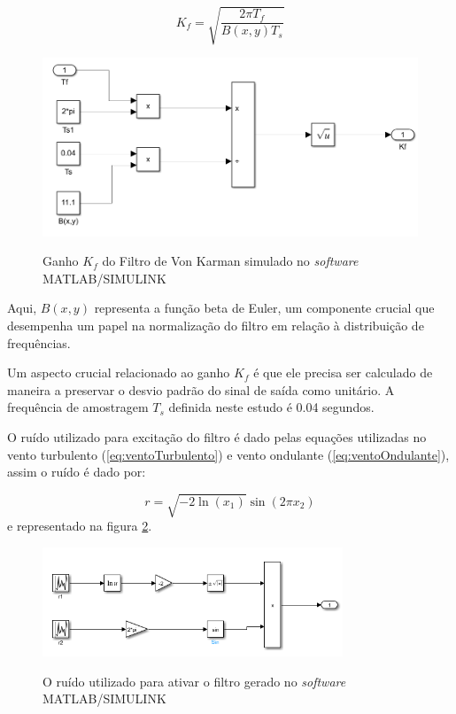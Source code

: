 \begin{equation}
K_f = \sqrt{\frac{2\pi T_f}{B(x, y) T_s}}
\label{eq:ganho do filtro Kf}
\end{equation}

\begin{figure}[h]
    \centering
    \caption{Ganho $K_f$ do Filtro de Von Karman simulado no \textit{software} MATLAB/SIMULINK}
    \includegraphics[width=\textwidth]{Figuras/Teorico/GanhoDoFiltro_Kf.png}
    \label{fig:coeficienteKf}
    
\end{figure}

Aqui, \(B(x, y)\) representa a função beta de Euler, um componente crucial que desempenha um papel na normalização do filtro em relação à distribuição de frequências.

Um aspecto crucial relacionado ao ganho \(K_f\) é que ele precisa ser calculado de maneira a preservar o desvio padrão do sinal de saída como unitário. A frequência de amostragem \(T_s\) definida neste estudo é 0.04 segundos.

O ruído utilizado para excitação do filtro é dado pelas equações utilizadas no vento turbulento (\ref{eq:ventoTurbulento}) e vento ondulante (\ref{eq:ventoOndulante}), assim o ruído é dado por:

\begin{equation}
r = \sqrt{-2 \ln(x_1)} \sin(2\pi x_2)
\label{eq:ruidogaussiano}
\end{equation}
e representado na figura \ref{fig:RuidoGaussiano}.

\begin{figure}[h]
    \centering
    \caption{O ruído utilizado para ativar o filtro gerado no \textit{software} MATLAB/SIMULINK}
    \includegraphics[width=0.8\textwidth]{Figuras/Teorico/ruidoGaussiano.png}
    \label{fig:RuidoGaussiano}    
\end{figure}

